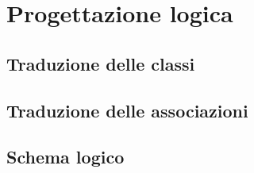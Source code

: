 \chapter{Progettazione logica}
\section{Traduzione delle classi}
\section{Traduzione delle associazioni}
\section{Schema logico}